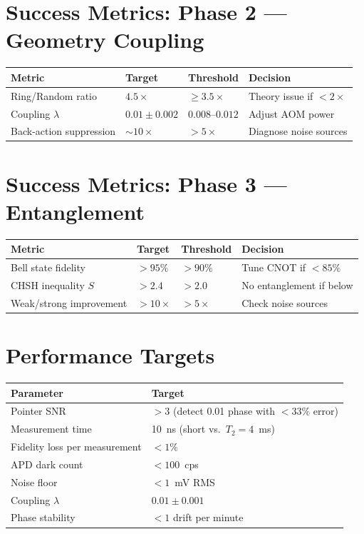 \documentclass[11pt,a4paper,openany]{book}
\begin{document}
\section{Success Metrics: Phase 2 --- Geometry Coupling}

\begin{center}
\begin{tabularx}{\textwidth}{|l|l|l|X|}
\hline
\textbf{Metric} & \textbf{Target} & \textbf{Threshold} & \textbf{Decision} \\
\hline
Ring/Random ratio & $4.5\times$ & $\geq 3.5\times$ & Theory issue if $< 2\times$ \\
\hline
Coupling $\lambda$ & $0.01 \pm 0.002$ & $0.008$--$0.012$ & Adjust AOM power \\
\hline
Back-action suppression & ${\sim}10\times$ & $> 5\times$ & Diagnose noise sources \\
\hline
\end{tabularx}
\end{center}

\section{Success Metrics: Phase 3 --- Entanglement}

\begin{center}
\begin{tabularx}{\textwidth}{|l|l|l|X|}
\hline
\textbf{Metric} & \textbf{Target} & \textbf{Threshold} & \textbf{Decision} \\
\hline
Bell state fidelity & $> 95\%$ & $> 90\%$ & Tune CNOT if $< 85\%$ \\
\hline
CHSH inequality $S$ & $> 2.4$ & $> 2.0$ & No entanglement if below \\
\hline
Weak/strong improvement & $> 10\times$ & $> 5\times$ & Check noise sources \\
\hline
\end{tabularx}
\end{center}

\section{Performance Targets}

\begin{center}
\begin{tabular}{ll}
\toprule
\textbf{Parameter} & \textbf{Target} \\
\midrule
Pointer SNR & $> 3$ (detect 0.01 phase with $< 33\%$ error) \\
Measurement time & 10~ns (short vs.\ $T_2 = 4$~ms) \\
Fidelity loss per measurement & $< 1\%$ \\
APD dark count & $< 100$~cps \\
Noise floor & $< 1$~mV RMS \\
Coupling $\lambda$ & $0.01 \pm 0.001$ \\
Phase stability & $< 1$\textdegree{} drift per minute \\
\bottomrule
\end{tabular}
\end{center}
\end{document}
